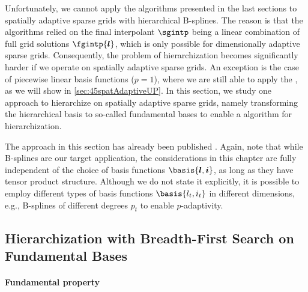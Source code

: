 \label{sec:44spatAdaptiveBFS}


\noindent
Unfortunately, we cannot apply the algorithms presented in the last
sections to spatially adaptive sparse grids with
hierarchical B-splines.
The reason is that the algorithms relied on the final interpolant $\sgintp$
being a linear combination of full grid solutions $\fgintp{\*l}$,
which is only possible for dimensionally adaptive sparse grids.
Consequently, the problem of hierarchization becomes significantly
harder if we operate on spatially adaptive sparse grids.
An exception is the case of piecewise linear basis functions ($p = 1$),
where we are still able to apply the \up,
as we will show in \cref{sec:45spatAdaptiveUP}.
%
In this section, we study one approach to hierarchize on
spatially adaptive sparse grids,
namely transforming the hierarchical basis to so-called fundamental bases
to enable a \bfs algorithm for hierarchization.

The approach in this section has already been published
\cite{Valentin18Fundamental}.
Again, note that while B-splines are our target application,
the considerations in this chapter are fully independent of the choice of
basis functions $\basis{\*l,\*i}$,
as long as they have tensor product structure.
Although we do not state it explicitly, it is possible to employ
different types of basis functions $\basis{l_t,i_t}$ in different
dimensions, e.g., B-splines of different degrees $p_t$
to enable $p$-adaptivity.



\subsection{Hierarchization with Breadth-First Search on Fundamental Bases}
\label{sec:441BFSFundamentalBases}

\paragraph{Fundamental property}

